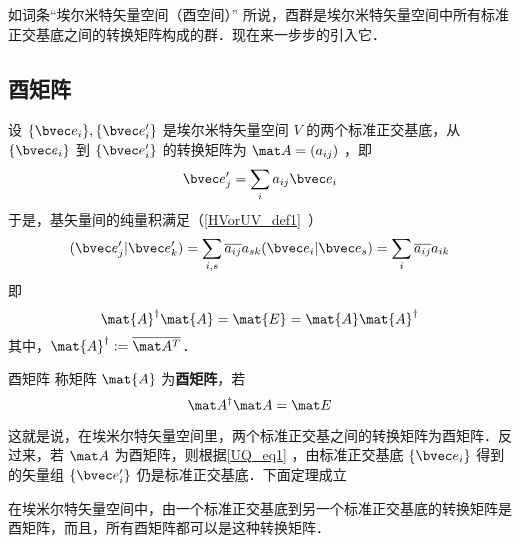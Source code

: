
如词条“埃尔米特矢量空间（酉空间）” 所说，酉群是埃尔米特矢量空间中所有标准正交基底之间的转换矩阵构成的群．现在来一步步的引入它．
\subsection{酉矩阵}
设 $\{\bvec e_i\},\{\bvec e'_i\}$ 是埃尔米特矢量空间 $V$ 的两个标准正交基底，从 $\{\bvec e_i\}$ 到 $\{\bvec e'_i\}$ 的转换矩阵为 $\mat A=(a_{ij})$ ，即
\begin{equation}\label{UQ_eq1}
\bvec e'_j=\sum_{i}a_{ij}\bvec e_i
\end{equation}
于是，基矢量间的纯量积满足（\autoref{HVorUV_def1}~）
\begin{equation}
(\bvec e'_j|\bvec e'_k)=\sum_{i,s}\overline{a_{ij}}a_{sk}(\bvec e_i|\bvec e_s)=\sum_{i}\overline{a_{ij}}a_{ik}
\end{equation}
即
\begin{equation}\label{UQ_eq2}
\mat{A}^\dagger \mat{A}=\mat{E}=\mat{A} \mat{A}^\dagger
\end{equation}
其中，$\mat{A}^\dagger:=\overline{\mat A^T}$．
\begin{definition}{酉矩阵}
称矩阵 $\mat{A}$ 为\textbf{酉矩阵}，若
\begin{equation}
\mat A^\dagger \mat A=\mat E
\end{equation}
\end{definition}
这就是说，在埃米尔特矢量空间里，两个标准正交基之间的转换矩阵为酉矩阵．反过来，若 $\mat A$ 为酉矩阵，则根据\autoref{UQ_eq1} ，由标准正交基底 $\{\bvec e_i\}$ 得到的矢量组 $\{\bvec e'_i\}$ 仍是标准正交基底．下面定理成立
\begin{theorem}{}
在埃米尔特矢量空间中，由一个标准正交基底到另一个标准正交基底的转换矩阵是酉矩阵，而且，所有酉矩阵都可以是这种转换矩阵．
\end{theorem}
